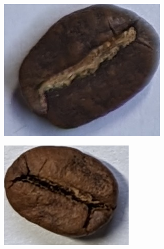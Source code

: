 \begin{figure}[h]
    \centering
    \begin{subfigure}
    {0.25\textwidth}
        \includegraphics[height=0.8\linewidth, keepaspectratio]{
            ./figures/methodology/normal-bean
        }
         \label{fig:normalBeanSingle}
    \end{subfigure}
    \begin{subfigure}
    {0.25\textwidth}
        \includegraphics[height=0.8\linewidth, keepaspectratio]{
            ./figures/methodology/quaker-bean
        }
         \label{fig:quakerBeanSingle}

\end{subfigure}
\end{figure}
